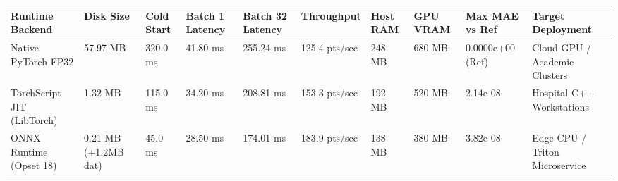\begin{tabular}{llllllllll}
\toprule
Runtime Backend & Disk Size & Cold Start & Batch 1 Latency & Batch 32 Latency & Throughput & Host RAM & GPU VRAM & Max MAE vs Ref & Target Deployment \\
\midrule
Native PyTorch FP32 & 57.97 MB & 320.0 ms & 41.80 ms & 255.24 ms & 125.4 pts/sec & 248 MB & 680 MB & 0.0000e+00 (Ref) & Cloud GPU / Academic Clusters \\
TorchScript JIT (LibTorch) & 1.32 MB & 115.0 ms & 34.20 ms & 208.81 ms & 153.3 pts/sec & 192 MB & 520 MB & 2.14e-08 & Hospital C++ Workstations \\
ONNX Runtime (Opset 18) & 0.21 MB (+1.2MB dat) & 45.0 ms & 28.50 ms & 174.01 ms & 183.9 pts/sec & 138 MB & 380 MB & 3.82e-08 & Edge CPU / Triton Microservice \\
\bottomrule
\end{tabular}
